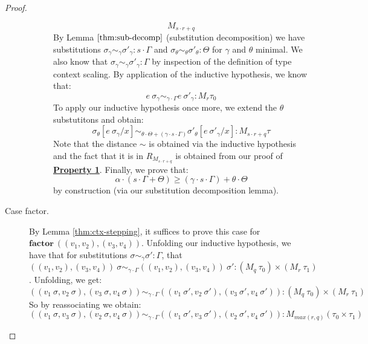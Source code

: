 \begin{proof}
\begin{description}
\begin{description}
$$          M_{s \cdot r + q}$$
          By Lemma $\ref{thm:sub-decomp}$ (substitution decomposition) we have
          substitutions 
          $\sigma_{\gamma} \sim_{\gamma} \sigma'_{\gamma} : s \cdot \Gamma$
          and $\sigma_{\theta} \sim_{\theta} \sigma'_{\theta} : \Theta$ for
          $\gamma$ and $\theta$ minimal. 
          We also know that 
          $\sigma_{\gamma} \sim_{\gamma} \sigma'_{\gamma} : \Gamma$ by
          inspection of the definition of type context scaling.
          By application of the inductive hypothesis, we know that:
          $$e~\sigma_{\gamma} \sim_{\gamma \cdot \Gamma} e~\sigma'_{\gamma} :
          M_r \tau_0 $$
          To apply our inductive hypothesis once more, we extend the $\theta$
          substutitons and obtain:
          $$\sigma_{\theta}[e~\sigma_{\gamma}/x] \sim_{\theta \cdot \Theta + (\gamma \cdot s \cdot \Gamma)}\sigma'_{\theta}[e~\sigma'_{\gamma}/x] : M_{s \cdot r + q} \tau$$
          Note that the distance $\sim$ is obtained via the inductive hypothesis
          and the fact that it is in $R_{M_{s \cdot r + q}}$ is obtained from
          our proof of \textbf{\underline{Property 1}}.
          Finally, we prove that:
          $$
          \alpha \cdot (s \cdot \Gamma + \Theta) \geq
          (\gamma \cdot s \cdot \Gamma) + \theta \cdot \Theta
          $$
          by construction (via our substitution decomposition lemma).
      \end{description}

    \item[Case factor.] 
      By Lemma \ref{thm:ctx-stepping}, it suffices to prove this case for 
      $\mathbf{factor}~((v_1, v_2), (v_3, v_4))$. 
      Unfolding our inductive hypothesis, we have that for substitutions
      $\sigma \sim_{\gamma} \sigma' : \Gamma$, that 
      $((v_1, v_2), (v_3, v_4))~\sigma \sim_{\gamma \cdot \Gamma} ((v_1, v_2),
      (v_3, v_4))~\sigma' : (M_q~\tau_0) \times (M_r~\tau_1)$.
      Unfolding, we get:
      $$
      ((v_1~\sigma, v_2~\sigma), (v_3~\sigma, v_4~\sigma)) \sim_{\gamma \cdot \Gamma} ((v_1~\sigma', v_2~\sigma'),
      (v_3~\sigma', v_4~\sigma')) : (M_q~\tau_0) \times (M_r~\tau_1)
      $$
      So by reassociating we obtain:
      $$
      ((v_1~\sigma, v_3~\sigma), (v_2~\sigma, v_4~\sigma)) \sim_{\gamma \cdot \Gamma} ((v_1~\sigma', v_3~\sigma'),
      (v_2~\sigma', v_4~\sigma')) : M_{max(r,q)}(\tau_0 \times \tau_1)
      $$
  \end{description}
\end{proof}

%

